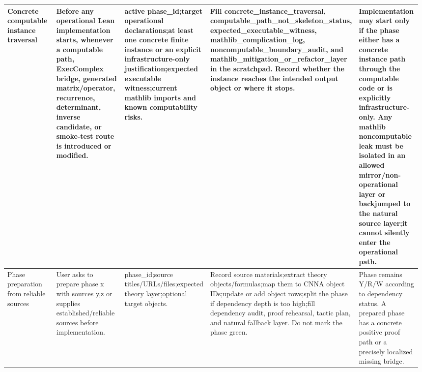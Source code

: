 \begin{longtable}{L{0.14\linewidth} L{0.19\linewidth} L{0.18\linewidth} L{0.31\linewidth} L{0.16\linewidth}}
Concrete computable instance traversal & Before any operational Lean implementation starts, whenever a computable path, ExecComplex bridge, generated matrix/\allowbreak{}operator, recurrence, determinant, inverse candidate, or smoke-test route is introduced or modified. & active phase\_id;\newline target operational declarations;\newline at least one concrete finite instance or an explicit infrastructure-only justification;\newline expected executable witness;\newline current mathlib imports and known computability risks. & Fill concrete\_instance\_traversal, computable\_path\_not\_skeleton\_status, expected\_executable\_witness, mathlib\_complication\_log, noncomputable\_boundary\_audit, and mathlib\_mitigation\_or\_refactor\_layer in the scratchpad. Record whether the instance reaches the intended output object or where it stops. & Implementation may start only if the phase either has a concrete instance path through the computable code or is explicitly infrastructure-only. Any mathlib noncomputable leak must be isolated in an allowed mirror/\allowbreak{}non-operational layer or backjumped to the natural source layer;\newline it cannot silently enter the operational path.\\
\hline
\addlinespace[0.24em]
Phase preparation from reliable sources & User asks to prepare phase x with sources y,z or supplies established/\allowbreak{}reliable sources before implementation. & phase\_id;\newline source titles/\allowbreak{}URLs/\allowbreak{}files;\newline expected theory layer;\newline optional target objects. & Record source materials;\newline extract theory objects/\allowbreak{}formulas;\newline map them to CNNA object IDs;\newline update or add object rows;\newline split the phase if dependency depth is too high;\newline fill dependency audit, proof rehearsal, tactic plan, and natural fallback layer. Do not mark the phase green. & Phase remains Y/\allowbreak{}R/\allowbreak{}W according to dependency status. A prepared phase has a concrete positive proof path or a precisely localized missing bridge.\\

\end{longtable}
